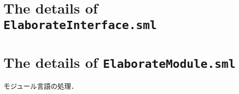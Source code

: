 \documentclass{jbook}
\newif\ifjp
\newcommand{\txt}[2]{#2}
\newcommand{\code}[1]{\mbox{\large\tt #1}}
\newcommand{\myem}{\mbox{\ \ }}
\newenvironment{program}{\begin{quote}\begin{tt}}%
                        {\end{tt}\end{quote}}
\begin{document}
\section{\txt{\code{ElaborateInterface.sml}の処理の詳細}{The details of \code{ElaborateInterface.sml}}}
\ifjp%
	インターフェイスの構文論的解釈処理．

\subsection{インターフェイスファイル\code{ElaborateInterface.smi}}
\begin{program}
structure ElaborateInterface =\\
\myem   struct\\
\myem\myem     type fixEnv = Fixity.fixity SEnv.map\\
\myem\myem     val elaborate\\
\myem\myem\myem   : AbsynInterface.interface -> fixEnv * PatternCalcInterface.interface\\
\myem\myem     val elaborateTopdecList\\
\myem\myem\myem   : AbsynInterface.itopdec list -> fixEnv * PatternCalcInterface.pitopdec list\\
\myem  end
\end{program}

\subsection{各関数の処理内容}
\begin{enumerate}
\item \code{elaborate}関数

	\code{Elaborator.elaborate}および
\code{Elaborator.elaborateInteractiveEnv}から呼び出され，インターフェイ
ス構文を処理．

\item \code{elaborateTopdecList}関数

\code{Elaborator.elaborateInteractiveEnv}から呼び出され，インターフェイス宣言文リストの処理を行う．

\end{enumerate}
\else%
\fi%

\section{\txt{\code{ElaborateModule.sml}の処理の詳細}{The details of \code{ElaborateModule.sml}}}
\ifjp%
	モジュール言語の処理．
\end{document}

